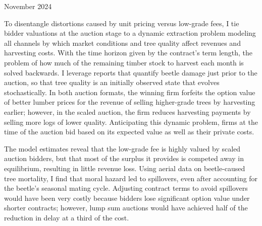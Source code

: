 \documentclass[11pt,letterpaper]{article}
\begin{document}
\newpage

\noindent November 2024

To disentangle distortions caused by unit pricing versus low-grade fees, I tie bidder valuations at the auction stage to a dynamic extraction problem modeling all channels by which market conditions and tree quality affect revenues and harvesting costs. With the time horizon given by the contract's term length, the problem of how much of the remaining timber stock to harvest each month is solved backwards. I leverage reports that quantify beetle damage just prior to the auction, so that tree quality is an initially observed state that evolves stochastically. In both auction formats, the winning firm forfeits the option value of better lumber prices for the revenue of selling higher-grade trees by harvesting earlier; however, in the scaled auction, the firm reduces harvesting payments by selling more logs of lower quality. Anticipating this dynamic problem, firms at the time of the auction bid based on its expected value as well as their private costs.

The model estimates reveal that the low-grade fee is highly valued by scaled auction bidders, but that most of the surplus it provides is competed away in equilibrium, resulting in little revenue loss. Using aerial data on beetle-caused tree mortality, I find that moral hazard led to spillovers, even after accounting for the beetle's seasonal mating cycle. Adjusting contract terms to avoid spillovers would have been very costly because bidders lose significant option value under shorter contracts; however, lump sum auctions would have achieved half of the reduction in delay at a third of the cost.
\end{document}

